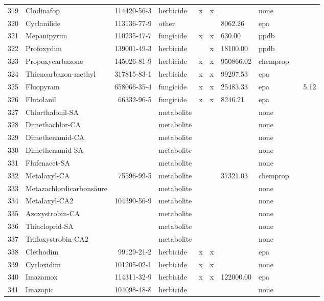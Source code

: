 \begin{longtable}{lp{3cm}rlp{0.5cm}p{0.5cm}p{1.5cm}p{1cm}p{1cm}p{1cm}}
  319 & Clodinafop & 114420-56-3 & herbicide & x & x &  & none &  &  \\ 
  320 & Cyclanilide & 113136-77-9 & other &  &  & 8062.26 & epa &  &  \\ 
  321 & Mepanipyrim & 110235-47-7 & fungicide & x & x & 630.00 & ppdb &  &  \\ 
  322 & Profoxydim & 139001-49-3 & herbicide &  & x & 18100.00 & ppdb &  &  \\ 
  323 & Propoxycarbazone & 145026-81-9 & herbicide & x & x & 950866.02 & chemprop &  &  \\ 
  324 & Thiencarbazon-methyl & 317815-83-1 & herbicide & x & x & 99297.53 & epa &  &  \\ 
  325 & Fluopyram & 658066-35-4 & fungicide & x & x & 25483.33 & epa &  & 5.12 \\ 
  326 & Flutolanil & 66332-96-5 & fungicide & x & x & 8246.21 & epa &  &  \\ 
  327 & Chlorthalonil-SA &  & metabolite &  &  &  & none &  &  \\ 
  328 & Dimethachlor-CA &  & metabolite &  &  &  & none &  &  \\ 
  329 & Dimethenamid-CA &  & metabolite &  &  &  & none &  &  \\ 
  330 & Dimethenamid-SA &  & metabolite &  &  &  & none &  &  \\ 
  331 & Flufenacet-SA &  & metabolite &  &  &  & none &  &  \\ 
  332 & Metalaxyl-CA & 75596-99-5 & metabolite &  &  & 37321.03 & chemprop &  &  \\ 
  333 & Metazachlordicarbonsäure &  & metabolite &  &  &  & none &  &  \\ 
  334 & Metalaxyl-CA2 & 104390-56-9 & metabolite &  &  &  & none &  &  \\ 
  335 & Azoxystrobin-CA &  & metabolite &  &  &  & none &  &  \\ 
  336 & Thiacloprid-SA &  & metabolite &  &  &  & none &  &  \\ 
  337 & Trifloxystrobin-CA2 &  & metabolite &  &  &  & none &  &  \\ 
  338 & Clethodim & 99129-21-2 & herbicide & x & x &  & epa &  &  \\ 
  339 & Cycloxidim & 101205-02-1 & herbicide & x & x &  & none &  &  \\ 
  340 & Imazamox & 114311-32-9 & herbicide & x & x & 122000.00 & epa &  &  \\ 
  341 & Imazapic & 104098-48-8 & herbicide &  &  &  & none &  &  \\ 

\end{longtable}
